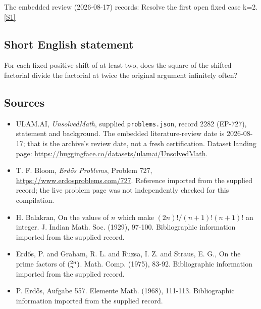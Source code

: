 \documentclass[11pt,a4paper]{article}
\newcommand{\sref}[2]{\hyperlink{source:#1:#2}{[S#2]}}
\begin{document}
The embedded review (2026-08-17) records: Resolve the first open fixed case k=2. \sref{2282}{1}

\subsection{Short English statement}

For each fixed positive shift of at least two, does the square of the shifted factorial divide the factorial at twice the original argument infinitely often?

\subsection{Sources}

{\small

\begin{itemize}

\item[\hypertarget{source:2282:1}{S1}] ULAM.AI, \emph{UnsolvedMath}, supplied \texttt{problems.json}, record 2282 (EP-727), statement and background. The embedded literature-review date is 2026-08-17; that is the archive’s review date, not a fresh certification. Dataset landing page: \url{https://huggingface.co/datasets/ulamai/UnsolvedMath}.

\item[\hypertarget{source:2282:2}{S2}] T. F. Bloom, \emph{Erdős Problems}, Problem 727, \url{https://www.erdosproblems.com/727}. Reference imported from the supplied record; the live problem page was not independently checked for this compilation.

\item[\hypertarget{source:2282:3}{S3}] H. Balakran, On the values of $n$ which make $(2n)!/(n+1)!(n+1)!$ an integer. J. Indian Math. Soc. (1929), 97-100. Bibliographic information imported from the supplied record.

\item[\hypertarget{source:2282:4}{S4}] Erd\H{o}s, P. and Graham, R. L. and Ruzsa, I. Z. and Straus, E. G., On the prime factors of $(\sp{2n}\sb{n})$. Math. Comp. (1975), 83-92. Bibliographic information imported from the supplied record.

\item[\hypertarget{source:2282:5}{S5}] P. Erd\H{o}s, Aufgabe 557. Elemente Math. (1968), 111-113. Bibliographic information imported from the supplied record.

\end{itemize}

}

\label{end:2282}
\end{document}
